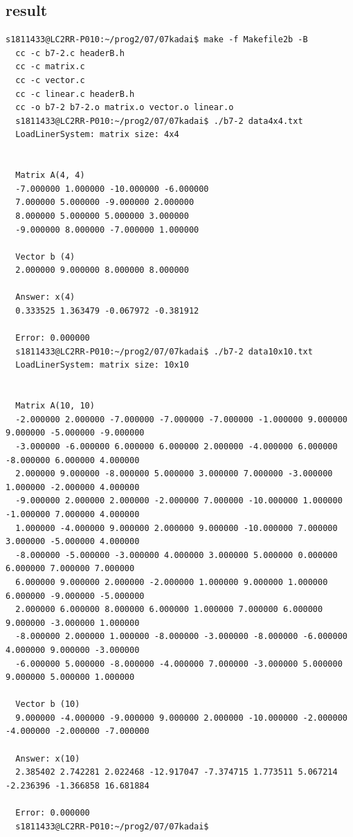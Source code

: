 \documentclass[10pt,a4paper]{jsarticle}
\begin{document}
\subsection{result}
\begin{lstlisting}[basicstyle=\ttfamily\footnotesize,frame=single,breaklines=tr\
    \
    ue]
  s1811433@LC2RR-P010:~/prog2/07/07kadai$ make -f Makefile2b -B
  cc -c b7-2.c headerB.h
  cc -c matrix.c
  cc -c vector.c
  cc -c linear.c headerB.h
  cc -o b7-2 b7-2.o matrix.o vector.o linear.o
  s1811433@LC2RR-P010:~/prog2/07/07kadai$ ./b7-2 data4x4.txt
  LoadLinerSystem: matrix size: 4x4


  Matrix A(4, 4)
  -7.000000 1.000000 -10.000000 -6.000000
  7.000000 5.000000 -9.000000 2.000000
  8.000000 5.000000 5.000000 3.000000
  -9.000000 8.000000 -7.000000 1.000000

  Vector b (4)
  2.000000 9.000000 8.000000 8.000000

  Answer: x(4)
  0.333525 1.363479 -0.067972 -0.381912

  Error: 0.000000
  s1811433@LC2RR-P010:~/prog2/07/07kadai$ ./b7-2 data10x10.txt
  LoadLinerSystem: matrix size: 10x10


  Matrix A(10, 10)
  -2.000000 2.000000 -7.000000 -7.000000 -7.000000 -1.000000 9.000000 9.000000 -5.000000 -9.000000
  -3.000000 -6.000000 6.000000 6.000000 2.000000 -4.000000 6.000000 -8.000000 6.000000 4.000000
  2.000000 9.000000 -8.000000 5.000000 3.000000 7.000000 -3.000000 1.000000 -2.000000 4.000000
  -9.000000 2.000000 2.000000 -2.000000 7.000000 -10.000000 1.000000 -1.000000 7.000000 4.000000
  1.000000 -4.000000 9.000000 2.000000 9.000000 -10.000000 7.000000 3.000000 -5.000000 4.000000
  -8.000000 -5.000000 -3.000000 4.000000 3.000000 5.000000 0.000000 6.000000 7.000000 7.000000
  6.000000 9.000000 2.000000 -2.000000 1.000000 9.000000 1.000000 6.000000 -9.000000 -5.000000
  2.000000 6.000000 8.000000 6.000000 1.000000 7.000000 6.000000 9.000000 -3.000000 1.000000
  -8.000000 2.000000 1.000000 -8.000000 -3.000000 -8.000000 -6.000000 4.000000 9.000000 -3.000000
  -6.000000 5.000000 -8.000000 -4.000000 7.000000 -3.000000 5.000000 9.000000 5.000000 1.000000

  Vector b (10)
  9.000000 -4.000000 -9.000000 9.000000 2.000000 -10.000000 -2.000000 -4.000000 -2.000000 -7.000000

  Answer: x(10)
  2.385402 2.742281 2.022468 -12.917047 -7.374715 1.773511 5.067214 -2.236396 -1.366858 16.681884

  Error: 0.000000
  s1811433@LC2RR-P010:~/prog2/07/07kadai$
  
\end{lstlisting}
\end{document}
